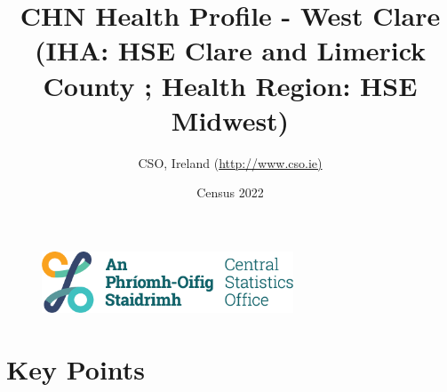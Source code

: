 \documentclass{article}
\title{CHN Health Profile - West Clare (IHA: HSE Clare and Limerick County ;  Health Region: HSE Midwest) }
\date{Census 2022}
\author{CSO, Ireland  (\url{http://www.cso.ie)}}
\begin{document}


\begin{figure}
	\centering
\includegraphics[width =75mm]{../figures/CSO_Logo.png}
\end{figure}

				 
		   
						  
														  
																																													
												 
			 
\maketitle
					
													   
				 
						 
																																																																											   
				 
				  
  \pagebreak
    	    \tableofcontents

\pagebreak


\section{Key Points}
\end{document}
